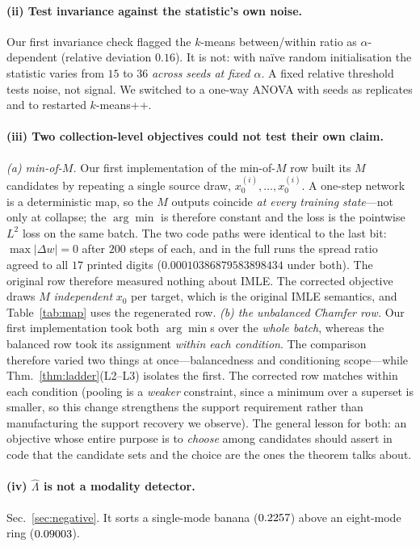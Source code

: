 \documentclass{article}
\theoremstyle{plain}
\newcommand{\cL}{\hat\Lambda}
\begin{document}
\paragraph{(ii) Test invariance against the statistic's own noise.}
Our first invariance check flagged the $k$-means between/within ratio as
$\alpha$-dependent (relative deviation $0.16$). It is not: with na\"ive random
initialisation the statistic varies from $15$ to $36$ \emph{across seeds at fixed
$\alpha$}. A fixed relative threshold tests noise, not signal. We switched to a
one-way ANOVA with seeds as replicates and to restarted $k$-means++.

\paragraph{(iii) Two collection-level objectives could not test their own claim.}
\emph{(a) min-of-$M$.} Our first implementation of the min-of-$M$ row built its $M$
candidates by repeating a single source draw, $x_0^{(i)},\dots,x_0^{(i)}$. A one-step
network is a deterministic map, so the $M$ outputs coincide \emph{at every training
state}---not only at collapse; the $\arg\min$ is therefore constant and the loss is the
pointwise $L^2$ loss on the same batch. The two code paths were identical to the last
bit: $\max|\Delta w|=0$ after $200$ steps of each, and in the full runs the spread ratio
agreed to all $17$ printed digits ($0.00010386879583898434$ under both). The original row
therefore measured nothing about IMLE. The corrected objective draws $M$
\emph{independent} $x_0$ per target, which is the original IMLE semantics, and
Table~\ref{tab:map} uses the regenerated row. \emph{(b) the unbalanced Chamfer row.} Our
first implementation took both $\arg\min$s over the \emph{whole batch}, whereas the
balanced row took its assignment \emph{within each condition}. The comparison therefore
varied two things at once---balancedness and conditioning scope---while
Thm.~\ref{thm:ladder}(L2--L3) isolates the first. The corrected row matches within each
condition (pooling is a \emph{weaker} constraint, since a minimum over a superset is
smaller, so this change strengthens the support requirement rather than manufacturing
the support recovery we observe). The general lesson for both: an objective whose entire
purpose is to \emph{choose} among candidates should assert in code that the candidate
sets and the choice are the ones the theorem talks about.

\paragraph{(iv) $\cL$ is not a modality detector.}
Sec.~\ref{sec:negative}. It sorts a single-mode banana ($0.2257$) above an
eight-mode ring ($0.09003$).
\end{document}
